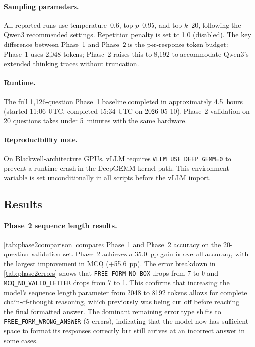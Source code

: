 \documentclass{article}
\begin{document}
\paragraph{Sampling parameters.} All reported runs use temperature~0.6, top-$p$~0.95, and top-$k$~20, following the Qwen3 recommended settings. Repetition penalty is set to 1.0 (disabled). The key difference between Phase~1 and Phase~2 is the per-response token budget: Phase~1 uses 2,048 tokens; Phase~2 raises this to 8,192 to accommodate Qwen3's extended thinking traces without truncation.

\paragraph{Runtime.} The full 1,126-question Phase~1 baseline completed in approximately 4.5~hours (started 11:06 UTC, completed 15:34 UTC on 2026-05-10). Phase~2 validation on 20 questions takes under 5~minutes with the same hardware.

\paragraph{Reproducibility note.} On Blackwell-architecture GPUs, vLLM requires \texttt{VLLM\_USE\_DEEP\_GEMM=0} to prevent a runtime crash in the DeepGEMM kernel path. This environment variable is set unconditionally in all scripts before the vLLM import.


\subsection{Results}
\label{sec:results}

\paragraph{Phase~2 sequence length results.}
\cref{tab:phase2comparison} compares Phase~1 and Phase~2 accuracy on the 20-question validation set. Phase~2 achieves a 35.0~pp gain in overall accuracy, with the largest improvement in MCQ (+55.6~pp). The error breakdown in \cref{tab:phase2errors} shows that \texttt{FREE\_FORM\_NO\_BOX} drops from 7 to 0 and \texttt{MCQ\_NO\_VALID\_LETTER} drops from 7 to 1. This confirms that increasing the model's sequence length parameter from 2048 to 8192 tokens allows for complete chain-of-thought reasoning, which previously was being cut off before reaching the final formatted answer. The dominant remaining error type shifts to \texttt{FREE\_FORM\_WRONG\_ANSWER} (5 errors), indicating that the model now has sufficient space to format its responses correctly but still arrives at an incorrect answer in some cases.
\end{document}
